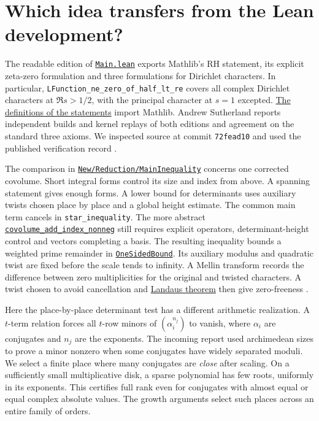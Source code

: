 \documentclass[11pt,letterpaper]{article}
\newcommand{\repo}[2]{\href{https://github.com/lsernau/grh-lean/blob/72fead102f663d5c7a407964a13dc0cf9d977207/grh/#1}{#2}}
\begin{document}
\section{Which idea transfers from the Lean development?}
The readable edition of \repo{src/Main.lean}{\texttt{Main.lean}} exports Mathlib's RH statement, its explicit zeta-zero formulation and three formulations for Dirichlet characters. In particular, \texttt{LFunction\_ne\_zero\_of\_half\_lt\_re} covers all complex Dirichlet characters at $\Re s>1/2$, with the principal character at $s=1$ excepted. \repo{src/Statements.lean}{The definitions of the statements} import Mathlib. Andrew Sutherland reports independent builds and kernel replays of both editions and agreement on the standard three axioms. We inspected source at commit \texttt{72fead10} and used the published verification record \cite{lean,audit}.

The comparison in \repo{src/New/Reduction/MainInequality.lean}{\texttt{New/Reduction/MainInequality}} concerns one corrected covolume. Short integral forms control its size and index from above. A spanning statement gives enough forms. A lower bound for determinants uses auxiliary twists chosen place by place and a global height estimate. The common main term cancels in \texttt{star\_inequality}. The more abstract \repo{src/New/Reduction/Lattices/TwistedLattice.lean}{\texttt{covolume\_add\_index\_nonneg}} still requires explicit operators, determinant-height control and vectors completing a basis. The resulting inequality bounds a weighted prime remainder in \repo{src/New/Reduction/OneSidedBound.lean}{\texttt{OneSidedBound}}. Its auxiliary modulus and quadratic twist are fixed before the scale tends to infinity. A Mellin transform records the difference between zero multiplicities for the original and twisted characters. A twist chosen to avoid cancellation and \repo{src/Lib/Analytic/Landau.lean}{Landau\textquotesingle s theorem} then give zero-freeness \cite{lean}.

Here the place-by-place determinant test has a different arithmetic realization. A $t$-term relation forces all $t$-row minors of $(\alpha_i^{n_j})$ to vanish, where $\alpha_i$ are conjugates and $n_j$ are the exponents. The incoming report used archimedean sizes to prove a minor nonzero when some conjugates have widely separated moduli. We select a finite place where many conjugates are \emph{close} after scaling. On a sufficiently small multiplicative disk, a sparse polynomial has few roots, uniformly in its exponents. This certifies full rank even for conjugates with almost equal or equal complex absolute values. The growth arguments select such places across an entire family of orders.
\end{document}
